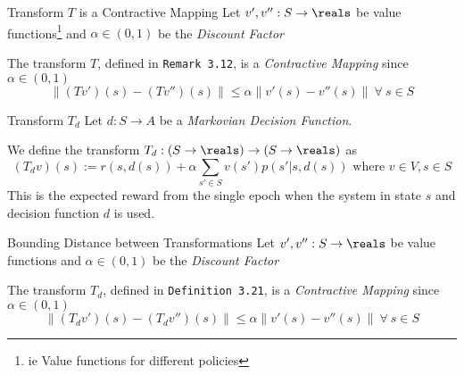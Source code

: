 \documentclass[11pt,a4paper]{article}
\begin{document}
  \begin{theorem}{Transform $T$ is a Contractive Mapping}
    Let $v',v'':S\to\reals$ be value functions\footnote{ie Value functions for different policies} and $\alpha\in(0,1)$ be the \textit{Discount Factor}
    \par The transform $T$, defined in \texttt{Remark 3.12}, is a \textit{Contractive Mapping} since $\alpha\in(0,1)$
    \[ \|(Tv')(s)-(Tv'')(s)\|\leq\alpha\|v'(s)-v''(s)\|\ \forall\ s\in S \]
  \end{theorem}

  \begin{definition}{Transform $T_d$}
    Let $d:S\to A$ be a \textit{Markovian Decision Function}.
    \par We define the transform $T_d:(S\to\reals)\to(S\to\reals)$ as
    \[ (T_dv)(s):=r(s,d(s))+\alpha\sum_{s'\in S}v(s')p(s'|s,d(s))\text{ where }v\in V,s\in S \]
    This is the expected reward from the single epoch when the system in state $s$ and decision function $d$ is used.
  \end{definition}

  \begin{theorem}{Bounding Distance between Transformations}
    Let $v',v'':S\to\reals$ be value functions and $\alpha\in(0,1)$ be the \textit{Discount Factor}
    \par The transform $T_d$, defined in \texttt{Definition 3.21}, is a \textit{Contractive Mapping} since $\alpha\in(0,1)$
    \[ \|(T_dv')(s)-(T_dv'')(s)\|\leq\alpha\|v'(s)-v''(s)\|\ \forall\ s\in S \]
  \end{theorem}
\end{document}
